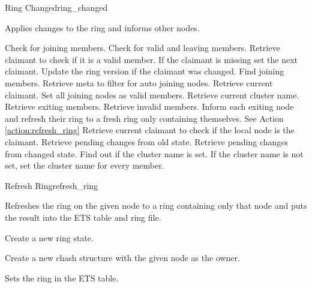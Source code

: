 \begin{actionbox}{Ring Changed}{ring_changed}
	\small
	\begin{action}
		 Applies changes to the ring and informs other nodes.
		\begin{action}
			 Check for joining members.
			 Check for valid and leaving members.
			 Retrieve claimant to check if it is a valid member.
			 If the claimant is missing set the next claimant.
			 Update the ring version if the claimant was changed.
			 Find joining members.
			 Retrieve meta to filter for auto joining nodes.
			 Retrieve current claimant.
			 Set all joining nodes as valid members.
			 Retrieve current cluster name.
			 Retrieve exiting members.
			 Retrieve invalid members.
			 Inform each exiting node and refresh their ring to a fresh ring only containing themselves.
			See Action \ref{action:refresh_ring}
			 Retrieve current claimant to check if the local node is the claimant.
			 Retrieve pending changes from old state.
			 Retrieve pending changes from changed state.
			 Find out if the cluster name is set.
			 If the cluster name is not set, set the cluster name for every member.
		\end{action}
	\end{action}
\end{actionbox}

\begin{actionbox}{Refresh Ring}{refresh_ring}
	\begin{action}
		 Refreshes the ring on the given node to a ring containing only that node and puts the result into the ETS table and ring file.
		\begin{action}
			 Create a new ring state.
			\begin{action}
				 Create a new chash structure with the given node as the owner.
			\end{action}
			 Sets the ring in the ETS table.
		\end{action}
	\end{action}
\end{actionbox}

